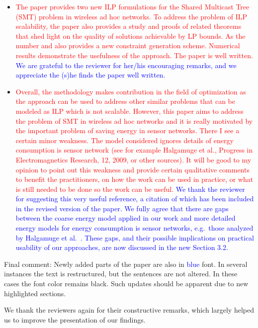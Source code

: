 \documentclass[12pt]{article}
\begin{document}
\begin{itemize}
\item \textcolor{red}{The paper provides two new ILP formulations for the Shared Multicast Tree (SMT) problem in wireless ad hoc networks.
To address the problem of ILP scalability, the paper also provides a study and proofs of related theorems that shed light on the quality of
solutions achievable by  LP  bounds.
As the number and also provides a new constraint generation scheme.
Numerical results demonstrate the usefulness of the approach. The paper is well written.} \textcolor{blue}{
We are grateful to the reviewer for her/his encouraging remarks, and we appreciate the (s)he finds the paper well written.
}
\item \textcolor{red}{Overall, the methodology makes contribution in the field of optimization as the approach can be used to address other similar problems
that can be modeled as ILP which is not scalable.
However, this paper aims to address the problem of SMT in wireless ad hoc networks and it is
really motivated by the important problem of saving energy in sensor networks.
There I see a certain minor weakness.
The model considered ignores details of energy consumption is sensor network
(see for example Halgamuge et al., Progress in Electromagnetics Research, 12, 2009, or other sources).
It will be good to my opinion to point out this weakness and provide certain qualitative comments to benefit the practitioners,
on how the work can be used in practice, or what is still needed to be done so the work can be useful.} \textcolor{blue}{
We thank the reviewer for suggesting this very useful reference, a citation of which has been included in the revised version of the paper.
We fully agree that there are gaps between the coarse energy model applied in our work and more detailed energy models for energy consumption is sensor networks,
e.g.\ those analyzed by Halgamuge et al.\ \cite{halgamuge}.
These gaps, and their possible implications on practical usability of our approaches, are now discussed in the new Section 3.2.
}
\end{itemize}

\noindent
Final comment: 
Newly added parts of the paper are also in \textcolor{blue}{blue} font.
In several instances the text is restructured, but the sentences are not altered. In these cases the font color remains black.
Such updates should be apparent due to new highlighted sections.

We thank the reviewers again for their constructive remarks, which largely helped us to improve the presentation of our findings.
\end{document}
